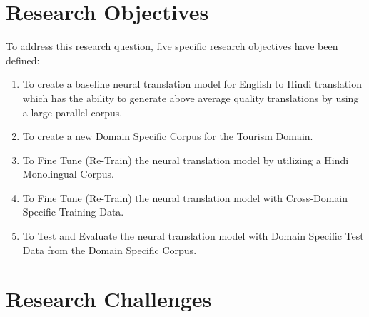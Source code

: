 \section{Research Objectives}
To address this research question, five specific research objectives have been defined:
\begin{enumerate}
    \item To create a baseline neural translation model for English to Hindi translation which has the ability to generate above average quality translations by using a large parallel corpus.
    \item To create a new Domain Specific Corpus for the Tourism Domain.
    \item To Fine Tune (Re-Train) the neural translation model by utilizing  a  Hindi Monolingual Corpus.
    \item To Fine Tune (Re-Train) the neural translation model with Cross-Domain Specific Training Data.
    \item To Test and Evaluate the neural translation model with Domain Specific Test Data from the Domain Specific Corpus.
\end{enumerate}
\section{Research Challenges}

